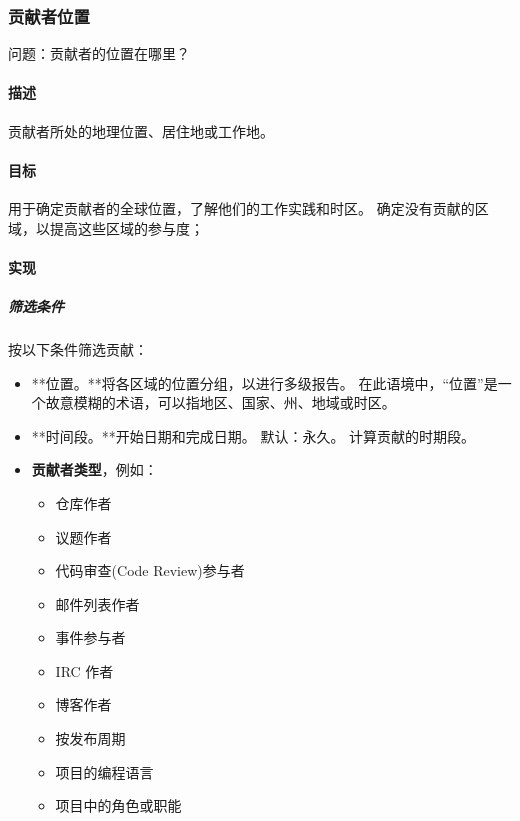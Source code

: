 \hypertarget{ux8d21ux732eux8005ux4f4dux7f6e}{%
\subsubsection{贡献者位置}\label{ux8d21ux732eux8005ux4f4dux7f6e}}

问题：贡献者的位置在哪里？

\hypertarget{ux63cfux8ff0}{%
\paragraph{描述}\label{ux63cfux8ff0}}

贡献者所处的地理位置、居住地或工作地。

\hypertarget{ux76eeux6807}{%
\paragraph{目标}\label{ux76eeux6807}}

用于确定贡献者的全球位置，了解他们的工作实践和时区。
确定没有贡献的区域，以提高这些区域的参与度；

\hypertarget{ux5b9eux73b0}{%
\paragraph{实现}\label{ux5b9eux73b0}}

\hypertarget{ux7b5bux9009ux6761ux4ef6}{%
\subparagraph{筛选条件}\label{ux7b5bux9009ux6761ux4ef6}}

按以下条件筛选贡献：

\begin{itemize}
\tightlist
\item
  **位置。**将各区域的位置分组，以进行多级报告。
  在此语境中，``位置''是一个故意模糊的术语，可以指地区、国家、州、地域或时区。
\item
  **时间段。**开始日期和完成日期。 默认：永久。 计算贡献的时期段。
\item
  \textbf{贡献者类型}，例如：

  \begin{itemize}
  \tightlist
  \item
    仓库作者
  \item
    议题作者
  \item
    代码审查(Code Review)参与者
  \item
    邮件列表作者
  \item
    事件参与者
  \item
    IRC 作者
  \item
    博客作者
  \item
    按发布周期
  \item
    项目的编程语言
  \item
    项目中的角色或职能
  \end{itemize}
\end{itemize}

